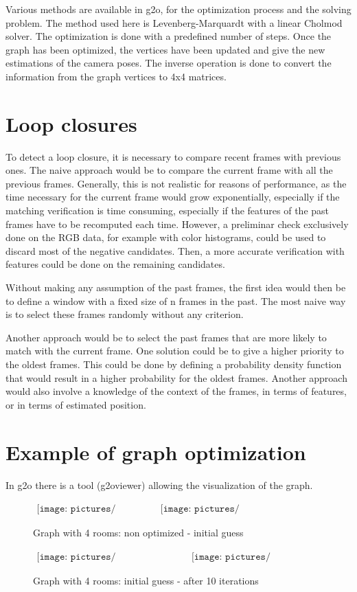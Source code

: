 Various methods are available in g2o, for the optimization process and the solving problem. The method used here is Levenberg-Marquardt with a linear Cholmod solver. The optimization is done with a predefined number of steps. Once the graph has been optimized, the vertices have been updated and give the new estimations of the camera poses. The inverse operation is done to convert the information from the graph vertices to 4x4 matrices.

\section{Loop closures}

To detect a loop closure, it is necessary to compare recent frames with previous ones. The naive approach would be to compare the current frame with all the previous frames. Generally, this is not realistic for reasons of performance, as the time necessary for the current frame would grow exponentially, especially if the matching verification is time consuming, especially if the features of the past frames have to be recomputed each time. However, a preliminar check exclusively done on the RGB data, for example with color histograms, could be used to discard most of the negative candidates. Then, a more accurate verification with features could be done on the remaining candidates.

Without making any assumption of the past frames, the first idea would then be to define a window with a fixed size of n frames in the past. The most naive way is to select these frames randomly without any criterion.

Another approach would be to select the past frames that are more likely to match with the current frame. One solution could be to give a higher priority to the oldest frames. This could be done by defining a probability density function that would result in a higher probability for the oldest frames. Another approach would also involve a knowledge of the context of the frames, in terms of features, or in terms of estimated position.

\section{Example of graph optimization}
In g2o there is a tool (g2oviewer) allowing the visualization of the graph.

\begin{figure}[h!]
\centering$
\begin{array}{cc}
\texttt{[image: pictures/graph4\_base]} &
\texttt{[image: pictures/graph4\_initial\_guess]}
\end{array}$
\caption{Graph with 4 rooms: non optimized - initial guess}
\end{figure}
\begin{figure}[h]
\centering$
\begin{array}{cc}
\texttt{[image: pictures/graph4\_initial\_guess]} &
\texttt{[image: pictures/graph4\_optimized]}
\end{array}$
\caption{Graph with 4 rooms: initial guess - after 10 iterations}
\end{figure}

